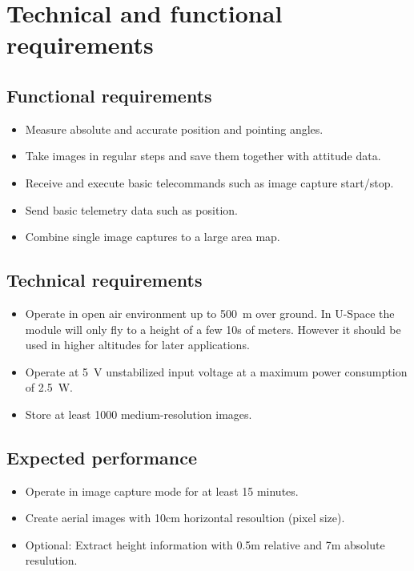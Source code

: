 \documentclass[fontsize=11pt,paper=a4,]{scrartcl}
\begin{document}
\section{Technical and functional requirements}
\subsection{Functional requirements}
\label{sub:Functional_requirements}
\begin{itemize}
\item Measure absolute and accurate position and pointing angles.
\item Take images in regular steps and save them together with attitude data.
\item Receive and execute basic telecommands such as image capture start/stop.
\item Send basic telemetry data such as position.
\item Combine single image captures to a large area map.
\end{itemize}


\subsection{Technical requirements}
\begin{itemize}
\item Operate in open air environment up to 500~m over ground. In U-Space the module will only fly to a height of a few 10s of meters. However it should be used in higher altitudes for later applications.
\item Operate at 5~V unstabilized input voltage at a maximum power consumption of 2.5~W.
\item Store at least 1000 medium-resolution images.
\end{itemize}


\subsection{Expected performance}
\begin{itemize}
\item Operate in image capture mode for at least 15 minutes.
\item Create aerial images with 10cm horizontal resoultion (pixel size).
\item Optional: Extract height information with 0.5m relative and 7m absolute resulution.
\end{itemize}
\end{document}
